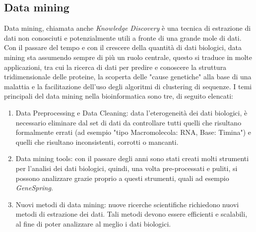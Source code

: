 \subsection{Data mining}
Data mining, chiamata anche \textit{Knowledge Discovery} è una tecnica di estrazione di dati non conosciuti e potenzialmente utili a fronte di una grande mole di dati. Con il passare del tempo e con il crescere della quantità di dati biologici, data mining sta assumendo sempre di più un ruolo centrale, questo si traduce in molte applicazioni, tra cui la ricerca di dati per predire e conoscere la struttura tridimensionale delle proteine, la scoperta delle "cause genetiche" alla base di una malattia e la facilitazione dell'uso degli algoritmi di clustering di sequenze.
\newline
I temi principali del data mining nella bioinformatica sono tre, di seguito elencati:
\begin{enumerate}
	\item Data Preprocessing e Data Cleaning: data l'eterogeneità dei dati biologici, è necessario eliminare dal set di dati da controllare tutti quelli che risultano formalmente errati (ad esempio "tipo Macromolecola: RNA, Base: Timina") e quelli che risultano inconsistenti, corrotti o mancanti.
	\item Data mining tools: con il passare degli anni sono stati creati molti strumenti per l'analisi dei dati biologici, quindi, una volta pre-processati e puliti, si possono analizzare grazie proprio a questi strumenti, quali ad esempio \textit{GeneSpring}.
	\item Nuovi metodi di data mining: nuove ricerche scientifiche richiedono nuovi metodi di estrazione dei dati. Tali metodi devono essere efficienti e scalabili, al fine di poter analizzare al meglio i dati biologici.
\end{enumerate}

